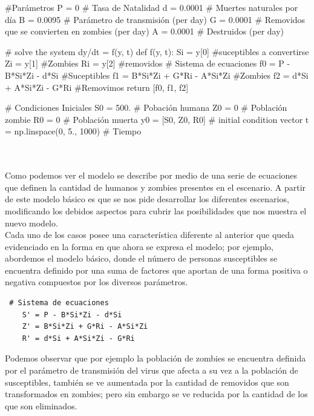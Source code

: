 \documentclass[12pt]{article}
\begin{document}
\begin{boxedverbatim}
#Parámetros
P = 0       # Tasa de Natalidad
d = 0.0001  # Muertes naturales por día
B = 0.0095  # Parámetro de transmisión  (per day)
G = 0.0001  # Removidos que se convierten en zombies (per day)
A = 0.0001  # Destruidos  (per day)

# solve the system dy/dt = f(y, t)
def f(y, t):
    Si = y[0] #suceptibles a convertirse
    Zi = y[1] #Zombies
    Ri = y[2] #removidos
    # Sistema de ecuaciones
    f0 = P - B*Si*Zi - d*Si #Suceptibles
    f1 = B*Si*Zi + G*Ri - A*Si*Zi #Zombies
    f2 = d*Si + A*Si*Zi - G*Ri #Removimos
    return [f0, f1, f2]

# Condiciones Iniciales
S0 = 500.                   # Pobación humana
Z0 = 0                      # Población zombie
R0 = 0                      # Población muerta
y0 = [S0, Z0, R0]   # initial condition vector
t  = np.linspace(0, 5., 1000)       # Tiempo

\end{boxedverbatim}\\
\\

Como podemos ver el modelo se describe por medio de una serie de ecuaciones que definen la cantidad de humanos y zombies presentes en el escenario. A partir de este modelo básico es que se nos pide desarrollar los diferentes escenarios, modificando los debidos aspectos para cubrir las posibilidades que nos muestra el nuevo modelo.\\

Cada uno de los casos posee una característica diferente al anterior que queda evidenciado en la forma en que ahora se expresa el modelo; por ejemplo, abordemos el modelo básico, donde el número de personas susceptibles se encuentra definido por una suma de factores que aportan de una forma positiva o negativa compuestos por los diversos parámetros.\\

 \begin{verbatim}
 # Sistema de ecuaciones
    S' = P - B*Si*Zi - d*Si 
    Z' = B*Si*Zi + G*Ri - A*Si*Zi
    R' = d*Si + A*Si*Zi - G*Ri 
 \end{verbatim}

Podemos observar que por ejemplo la población de zombies se encuentra definida por el parámetro de transmisión del virus que afecta a su vez a la población de susceptibles, también se ve aumentada por la cantidad de removidos que son transformados en zombies; pero sin embargo se ve reducida por la cantidad de los que son eliminados.\\
\end{document}
